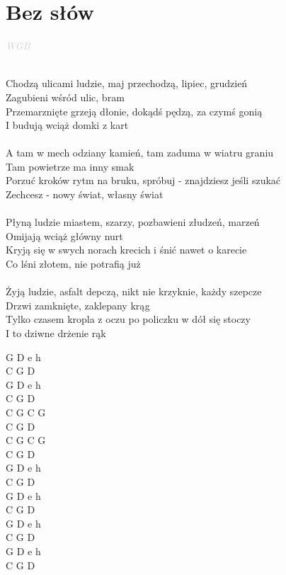 \documentclass[a5paper, 10pt]{book}
\begin{document}
\section{Bez słów}\textcolor{lightgray}{\textit{WGB}}\\~\\
\begin{minipage}[t]{0.85\textwidth}
Chodzą ulicami ludzie, maj przechodzą, lipiec, grudzień\\
Zagubieni wśród ulic, bram\\
Przemarznięte grzeją dłonie, dokądś pędzą, za czymś gonią\\
I budują wciąż domki z kart\\
\\
\hspace*{5mm}A tam w mech odziany kamień, tam zaduma w wiatru graniu\\
\hspace*{5mm}Tam powietrze ma inny smak\\
\hspace*{5mm}Porzuć kroków rytm na bruku, spróbuj - znajdziesz jeśli szukać\\
\hspace*{5mm}Zechcesz - nowy świat, własny świat\\
\\
Płyną ludzie miastem, szarzy, pozbawieni złudzeń, marzeń\\
Omijają wciąż główny nurt\\
Kryją się w swych norach krecich i śnić nawet o karecie\\
Co lśni złotem, nie potrafią już\\
\\
Żyją ludzie, asfalt depczą, nikt nie krzyknie, każdy szepcze\\
Drzwi zamknięte, zaklepany krąg\\
Tylko czasem kropla z oczu po policzku w dół się stoczy\\
I to dziwne drżenie rąk\\
\end{minipage}
\begin{minipage}[t]{0.2\textwidth}
G D e h\\
C G D\\
G D e h\\
C G D\\

C G C G\\
C G D\\
C G C G\\
C G D\\

G D e h\\
C G D\\
G D e h\\
C G D\\

G D e h\\
C G D\\
G D e h\\
C G D\\
\end{minipage}
\end{document}
